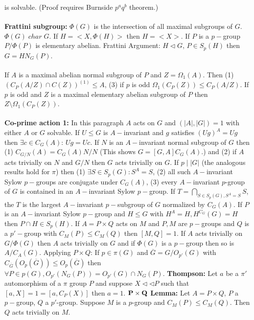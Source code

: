 is solvable. (Proof requires Burnside $p^a q^b$ theorem.)\\
\\
{\bf Frattini subgroup:} $\Phi(G)$ is the intersection of all maximal subgroups of $G$.
$\Phi(G) \; char \; G$.  If $H= <X, \Phi(H)>$ then $H= <X>$.  If $P$
is a $p-$group $P/\Phi(P)$ is elementary abelian.
Frattini Argument: $H \lhd G$, $P \in S_p(H)$ then $G=H N_G(P)$.\\
\\
If $A$ is a maximal abelian normal subgroup of $P$ and $Z=\Omega_1(A)$.  Then
(1) $(C_P(A/Z) \cap C(Z))^{(1)} \le A$, (3) if $p$ is odd $\Omega_1(C_P(Z)) \le C_P(A/Z)$.
If $p$ is odd and $Z$ is a maximal elementary abelian subgroup of $P$ then
$Z \setminus \Omega_1 (C_P(Z))$.\\
\\
{\bf Co-prime action 1:}
In this paragraph $A$ acts on $G$ and $(|A|, |G|)=1$ with either
$A$ or $G$ solvable.  If $U \leq G$ is $A-$invariant and $g$ satisfies $(Ug)^A=Ug$ then
$\exists c \in C_G(A)$: $Ug=Uc$. If $N$ is an $A-$invariant normal subgroup of $G$ then
(1) $C_{G/N}(A)= C_G(A)N/N$ (This shows $G=[G,A]C_G(A)$.) and (2) if $A$ acts
trivially on $N$ and $G/N$ then $G$ acts trivially on $G$. If $p \mid |G|$ (the analogous
results hold for $\pi$) then (1) $\exists S \in S_p(G): S^A=S$, (2) all such $A-$invariant
Sylow $p-$groups are conjugate under $C_G(A)$, (3) every $A-$invariant $p$-group of
$G$ is contained in an $A-$invariant Sylow $p-$group.  
If $T=\bigcap_{S \in S_p(G), S^A=S} S$,
the $T$ is the largest $A-$invariant $p-$subgroup of $G$ normalized by $C_G(A)$.  If
$P$ is an $A-$invariant Sylow $p-$group and $H \le G$ with $H^A=H, H^{C_G}(G)=H$ then
$P \cap H \in S_p(H)$.  If $A= P \times Q$ acts on $M$ and $P, M$ are $p-$groups and
$Q$ is a $p'-$group with $C_M(P) \le C_M(Q)$ then $[M,Q]=1$. If $A$ acts trivially on
$G/\Phi(G)$ then $A$ acts trivially on $G$ and if $\Phi(G)$ is a $p-$group then
so is $A/C_A(G)$. 
Applying $P \times Q$: If $p \in \pi(G)$ and ${\overline G}= G/O_{p'}(G)$
with $C_{\overline G}(O_p({\overline G})) \le O_p({\overline G})$ then 
$\forall P \in p(G), O_{p'}(N_G(P))=O_{p'}(G) \cap N_G(P)$.
{\bf Thompson:} Let $a$ be a $\pi'$ automorphism of a $\pi$ group $P$ and suppose
$X \lhd \lhd P$ such that $[a,X]=1=[a,C_P(X)]$ then $a=1$.
${\bf P \times Q}$ {\bf Lemma:} Let $A= P \times Q$, $P$ a $p-$group, $Q$ a $p'$-group.
Suppose $M$ is a $p$-group and $C_M(P) \le C_M(Q)$.  Then $Q$ acts trivially on $M$.\\
\\
